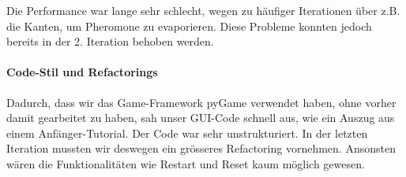 Die Performance war lange sehr schlecht, wegen zu häufiger Iterationen über z.B. die Kanten, um Pheromone zu evaporieren. Diese Probleme konnten jedoch bereits in der 2. Iteration behoben werden.

\paragraph*{Code-Stil und Refactorings}

Dadurch, dass wir das Game-Framework pyGame verwendet haben, ohne vorher damit gearbeitet zu haben, sah unser GUI-Code schnell aus, wie ein Auszug aus einem Anfänger-Tutorial. Der Code war sehr unstrukturiert. In der letzten Iteration mussten wir deswegen ein grösseres Refactoring vornehmen. Ansonsten wären die Funktionalitäten wie Restart und Reset kaum möglich gewesen.